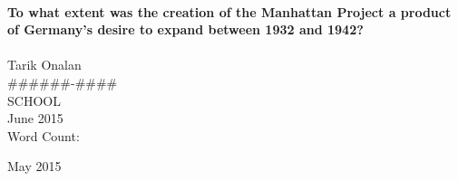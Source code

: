 \begin{titlepage}
    \begin{center}
        \HRule \\[0.4cm]
        { \large \bfseries To what extent was the creation of the Manhattan Project a product of Germany's desire to expand between 1932 and 1942? \\[0.4cm] }
        \HRule \\[1.5cm]

        Tarik Onalan
        \\[0.4cm]
        \#\#\#\#\#\#-\#\#\#\#
        \\[0.4cm]
        SCHOOL
        \\[0.4cm]
        June 2015
        \\[0.4cm]
        Word Count:
        \vfill

        {\large May 2015}
    \end{center}
\end{titlepage}